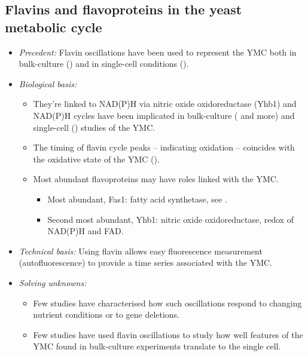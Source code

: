 \subsection{Flavins and flavoproteins in the yeast metabolic cycle}
\label{subsec:intro-flavin-ymc}
\begin{itemize}
\item \emph{Precedent:} Flavin oscillations have been used to represent the YMC both in bulk-culture (\cite{murrayRedoxRegulationRespiring2011}) and in single-cell conditions (\cite{baumgartnerFlavinbasedMetabolicCycles2018}).

\item \emph{Biological basis:}
\begin{itemize}
\item They're linked to NAD(P)H via nitric oxide oxidoreductase (Yhb1) and NAD(P)H cycles have been implicated in bulk-culture (\cite{tuLogicYeastMetabolic2005} and more) and single-cell (\cite{papagiannakisAutonomousMetabolicOscillations2017}) studies of the YMC.
\item The timing of flavin cycle peaks -- indicating oxidation -- coincides with the oxidative state of the YMC (\cite{murrayRedoxRegulationRespiring2011}).
\item Most abundant flavoproteins may have roles linked with the YMC.
\begin{itemize}
\item Most abundant, Fas1: fatty acid synthetase, see \cite{campbellBuildingBlocksAre2020}.
\item Second most abundant, Yhb1: nitric oxide oxidoreductase, redox of NAD(P)H and FAD.
\end{itemize}
\end{itemize}


\item \emph{Technical basis:} Using flavin allows easy fluorescence measurement (autofluorescence) to provide a time series associated with the YMC.

\item \emph{Solving unknowns:}
\begin{itemize}
\item Few studies have characterised how such oscillations respond to changing nutrient conditions or to gene deletions.
\item Few studies have used flavin oscillations to study how well features of the YMC found in bulk-culture experiments translate to the single cell.
\end{itemize}
\end{itemize}

